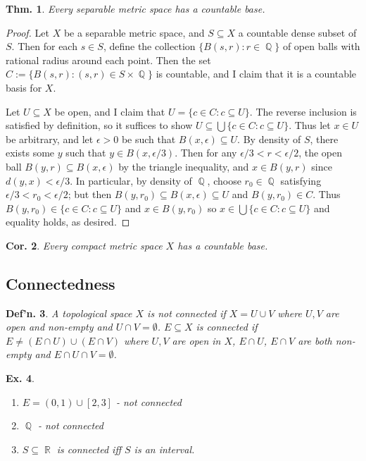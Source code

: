 \documentclass[12pt, a4paper]{book}
\DeclareMathOperator{\Q}{\mathbb{Q}}
\DeclareMathOperator{\R}{\mathbb{R}}
\newtheorem{theorem}{Thm.}[section]
\newtheorem{definition}[theorem]{Def'n.}
\newtheorem{corollary}[theorem]{Cor.}
\newtheorem{example}[theorem]{Ex.}
\theoremstyle{nonumberplain}
\newtheorem{proof}{Proof}
\begin{document}
\begin{theorem}
    Every separable metric space has a countable base.
\end{theorem}
\begin{proof}
    Let $X$ be a separable metric space, and $S\subseteq X$ a countable dense subset of $S$. Then for each
    $s\in S$, define the collection $\{B(s,r):r\in\Q\}$ of open balls with rational radius around each point.
    Then the set $C:=\{B(s,r):(s,r)\in S\times\Q\}$ is countable, and I claim that it is a countable basis for
    $X$.

    Let $U\subseteq X$ be open, and I claim that $U=\{c\in C:c\subseteq U\}$. The reverse inclusion is satisfied
    by definition, so it suffices to show $U\subseteq \bigcup\{c\in C:c\subseteq U\}$. Thus let $x\in U$ be arbitrary,
    and let $\epsilon>0$ be such that $B(x,\epsilon)\subseteq U$. By density of $S$, there exists some $y$ such that
    $y\in B(x,\epsilon/3)$. Then for any $\epsilon/3<r<\epsilon/2$, the open ball $B(y,r)\subseteq B(x,\epsilon)$
    by the triangle inequality, and $x\in B(y,r)$ since $d(y,x)<\epsilon/3$. In particular, by density
    of $\Q$, choose $r_0\in\Q$ satisfying $\epsilon/3<r_0<\epsilon/2$; but then $B(y,r_0)\subseteq B(x,\epsilon)\subseteq U$
    and $B(y,r_0)\in C$. Thus $B(y,r_0)\in\{c\in C:c\subseteq U\}$ and $x\in B(y,r_0)$ so $x\in\bigcup\{c\in C:c\subseteq U\}$
    and equality holds, as desired.
\end{proof}
\begin{corollary}
    Every compact metric space $X$ has a countable base.
\end{corollary}
\subsection{Connectedness}
\begin{definition}
    A topological space $X$ is \textit{not connected} if $X=U\cup V$ where $U,V$ are open and non-empty and $U\cap V=\emptyset$.
    $E\subseteq X$ is connected if $E\neq (E\cap U)\cup (E\cap V)$ where $U,V$ are open in $X$, $E\cap U$, $E\cap V$ are both
    non-empty and $E\cap U\cap V=\emptyset$.
\end{definition}
\begin{example}
    \begin{enumerate}
        \item $E=(0,1)\cup[2,3]$ - not connected
        \item $\Q$ - not connected
        \item $S\subseteq\R$ is connected iff $S$ is an interval.
    \end{enumerate}
\end{example}
\end{document}
